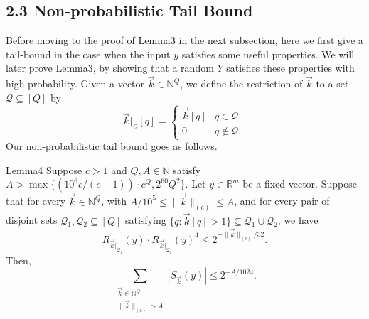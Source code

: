 \subsection*{2.3 Non-probabilistic Tail Bound}
Before moving to the proof of Lemma3 in the next subsection, here we first give a tail-bound in the case when the input $y$ satisfies some useful properties. We will later prove Lemma3, by showing that a random $Y$ satisfies these properties with high probability. Given a vector $\vec k\in\mathbb N^Q$, we define the restriction of $\vec k$ to a set $\mathcal Q\subseteq[Q]$ by
\[
\vec k|_{\mathcal Q}[q]=\begin{cases}\vec k[q]&q\in\mathcal Q,\\0&q\notin\mathcal Q.\end{cases}
\]
Our non-probabilistic tail bound goes as follows.
\begin{authorclaim}{Lemma4}
Suppose $c>1$ and $Q,A\in\mathbb N$ satisfy $A>\max\{(10^6c/(c-1))\cdot c^Q,2^{60}Q^2\}$. Let $y\in\mathbb R^m$ be a fixed vector. Suppose that for every $\vec k\in\mathbb N^Q$, with $A/10^5\le\|\vec k\|_{(c)}\le A$, and for every pair of disjoint sets $\mathcal Q_1,\mathcal Q_2\subseteq[Q]$ satisfying $\{q:\vec k[q]>1\}\subseteq\mathcal Q_1\cup\mathcal Q_2$, we have
\[
R_{\vec k|_{\mathcal Q_1}}(y)\cdot R_{\vec k|_{\mathcal Q_2}}(y)^4\le2^{-\|\vec k\|_{(c)}/32}.
\]
Then,
\[
\sum_{\substack{\vec k\in\mathbb N^Q\\\|\vec k\|_{(c)}>A}}|S_{\vec k}(y)|\le2^{-A/1024}.
\]
\end{authorclaim}
